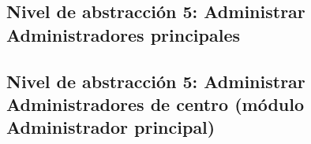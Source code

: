 \subsection{Nivel de abstracción 5: Administrar Administradores principales}



\subsection{Nivel de abstracción 5: Administrar Administradores de centro (módulo Administrador principal)}


